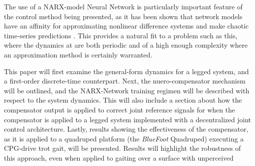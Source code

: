 The use of a NARX-model Neural Network is particularly important feature of the control method being presented, 
as it has been shown that network models have an affinity for approximating nonlinear difference systems and make 
chaotic time-series predictions \cite{Tsungnan1996,ChenBillings1990,Hihi1996,Billings2013}. This provides
a natural fit to a problem such as this, where the dynamics at are both periodic and of a high enough complexity
where an approximation method is certainly warranted.

This paper will first examine the general-form dynamics for a legged system, and a first-order discrete-time counterpart. 
Next, the nuero-compensator mechanism will be outlined, and the NARX-Network training regimen will be described with respect
to the system dynamics. This will also include a section about how the compensator output is applied to correct joint reference 
signals for when the compensator is applied to a legged system implemented with a decentralized joint control architecture. 
Lastly, results showing the effectiveness of the compensator, as it is applied to a quadruped platform (the \emph{BlueFoot} 
Quadruped) executing a CPG-drive trot gait, will be presented. Results will highlight the robustness of this approach,
even when applied to gaiting over a surface with unperceived 